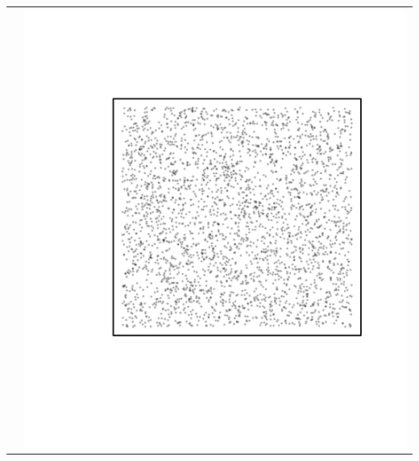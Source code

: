 \documentclass{article}\usepackage{graphicx, color}
\makeatletter
\def\maxwidth{ %
  \ifdim\Gin@nat@width>\linewidth
    \linewidth
  \else
    \Gin@nat@width
  \fi
}
\newenvironment{knitrout}{}{} %
\makeatother
\begin{document}
\begin{tabular}{cc}
&
\begin{knitrout}
\definecolor{shadecolor}{rgb}{0.969, 0.969, 0.969}\color{fgcolor}\includegraphics[width=\maxwidth]{figure/unnamed-chunk-22} 
\end{knitrout}

\\
\end{tabular}
\end{document}
